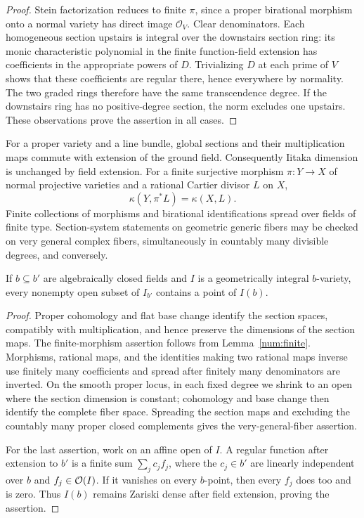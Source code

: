\begin{proof}
Stein factorization reduces to finite $\pi$, since a proper birational
morphism onto a normal variety has direct image $\mathcal O_V$.
Clear denominators. Each homogeneous section upstairs is integral over
the downstairs section ring: its monic characteristic polynomial in
the finite function-field extension has coefficients in the appropriate
powers of $D$. Trivializing $D$ at each prime of $V$ shows that these
coefficients are regular there, hence everywhere by normality. The
two graded rings therefore have the same transcendence degree. If the
downstairs ring has no positive-degree section, the norm excludes one
upstairs. These observations prove the assertion in all cases.
\end{proof}

\begin{lemma}
\label{prelim:generic}\label{lem:field-transfer}
For a proper variety and a line bundle, global sections and their
multiplication maps commute with extension of the ground field.
Consequently Iitaka dimension is unchanged by field extension.
For a finite surjective morphism \(\pi:Y\to X\) of normal projective
varieties and a rational Cartier divisor \(L\) on \(X\),
\[
 \kappa(Y,\pi^*L)=\kappa(X,L).
\]
Finite collections of morphisms and birational identifications spread
over fields of finite type. Section-system statements on geometric
generic fibers may be checked on very general complex fibers,
simultaneously in countably many divisible degrees, and conversely.

If \(b\subseteq b'\) are algebraically closed fields and \(I\) is a
geometrically integral \(b\)-variety, every nonempty open subset of
\(I_{b'}\) contains a point of \(I(b)\).
\end{lemma}

\begin{proof}
Proper cohomology and flat base change identify the section spaces,
compatibly with multiplication, and hence preserve the dimensions of
the section maps. The finite-morphism assertion follows from Lemma~\ref{num:finite}. Morphisms, rational maps, and the identities making two
rational maps inverse use finitely many coefficients and spread after
finitely many denominators are inverted. On the smooth proper locus, in each fixed degree we shrink to an open
where the section dimension is constant; cohomology and base change
then identify the complete fiber space. Spreading the section maps
and excluding the countably many proper closed complements gives the
very-general-fiber assertion.

For the last assertion, work on an affine open of \(I\). A regular
function after extension to \(b'\) is a finite sum
\(\sum_j c_jf_j\), where the \(c_j\in b'\) are linearly independent
over \(b\) and \(f_j\in\mathcal O(I)\). If it vanishes on every \(b\)-point,
then every \(f_j\) does too and is zero. Thus \(I(b)\) remains Zariski
dense after field extension, proving the assertion.
\end{proof}

